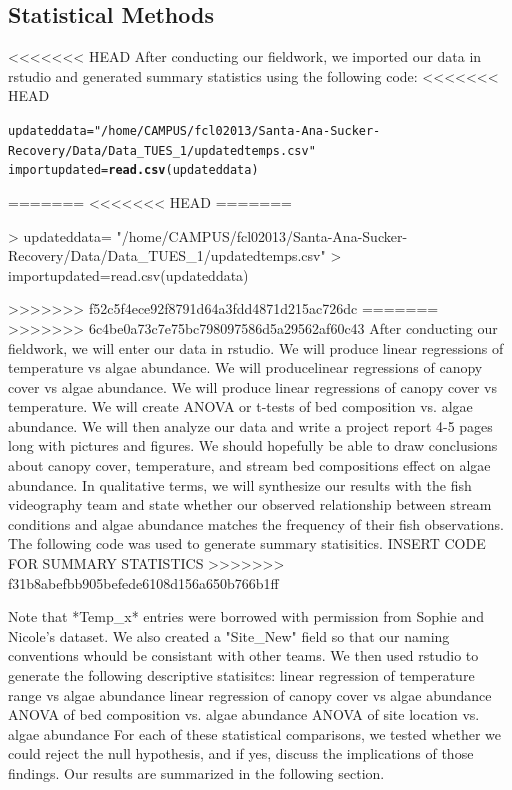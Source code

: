 \documentclass{article}\usepackage[]{graphicx}\usepackage[]{color}
\makeatletter
\newcommand{\hlstr}[1]{\textcolor[rgb]{0.192,0.494,0.8}{#1}}%
\newcommand{\hlstd}[1]{\textcolor[rgb]{0.345,0.345,0.345}{#1}}%
\newcommand{\hlkwb}[1]{\textcolor[rgb]{0.69,0.353,0.396}{#1}}%
\newcommand{\hlkwd}[1]{\textcolor[rgb]{0.737,0.353,0.396}{\textbf{#1}}}%
\newenvironment{kframe}{%
 \def\at@end@of@kframe{}%
 \ifinner\ifhmode%
  \def\at@end@of@kframe{\end{minipage}}%
  \begin{minipage}{\columnwidth}%
 \fi\fi%
 \def\FrameCommand##1{\hskip\@totalleftmargin \hskip-\fboxsep
 \colorbox{shadecolor}{##1}\hskip-\fboxsep
     \hskip-\linewidth \hskip-\@totalleftmargin \hskip\columnwidth}%
 \MakeFramed {\advance\hsize-\width
   \@totalleftmargin\z@ \linewidth\hsize
   \@setminipage}}%
 {\par\unskip\endMakeFramed%
 \at@end@of@kframe}
\newenvironment{knitrout}{}{} %
\makeatother
\begin{document}
\subsection{Statistical Methods}
<<<<<<< HEAD
After conducting our ﬁeldwork, we imported our data in rstudio and generated summary statistics using the following code: 
<<<<<<< HEAD
\begin{knitrout}
\color{fgcolor}\begin{kframe}
\begin{alltt}
\hlstd{updateddata}\hlkwb{=} \hlstr{"/home/CAMPUS/fcl02013/Santa-Ana-Sucker-Recovery/Data/Data_TUES_1/updatedtemps.csv"}
\hlstd{importupdated}\hlkwb{=}\hlkwd{read.csv}\hlstd{(updateddata)}
\end{alltt}
\end{kframe}
\end{knitrout}
=======
<<<<<<< HEAD
=======
\begin{Schunk}
\begin{Sinput}
> updateddata= "/home/CAMPUS/fcl02013/Santa-Ana-Sucker-Recovery/Data/Data_TUES_1/updatedtemps.csv"
> importupdated=read.csv(updateddata)
\end{Sinput}
\end{Schunk}
>>>>>>> f52c5f4ece92f8791d64a3fdd4871d215ac726dc
=======
>>>>>>> 6c4be0a73c7e75bc798097586d5a29562af60c43
After conducting our ﬁeldwork, we will enter our data in rstudio. We will produce linear regressions of temperature vs algae abundance. We will producelinear regressions of canopy cover vs algae abundance. We will produce linear regressions of canopy cover vs temperature. We will create ANOVA or t-tests of bed composition vs. algae abundance. We will then analyze our data and write a project report 4-5 pages long with pictures and ﬁgures. We should hopefully be able to draw conclusions about canopy cover, temperature, and stream bed compositions eﬀect on algae abundance. In qualitative terms, we will synthesize our results with the ﬁsh videography team and state whether our observed relationship between stream conditions and algae abundance matches the frequency of their ﬁsh observations.
The following code was used to generate summary statisitics. 
INSERT CODE FOR SUMMARY STATISTICS
>>>>>>> f31b8abefbb905befede6108d156a650b766b1ff

Note that *Temp_x* entries were borrowed with permission from Sophie and Nicole's dataset. We also created a "Site_New" field so that our naming conventions whould be consistant with other teams. We then used rstudio to generate the following descriptive statisitcs:  
linear regression of temperature range vs algae abundance
linear regression of canopy cover vs algae abundance
ANOVA of bed composition vs. algae abundance
ANOVA of site location vs. algae abundance
For each of these statistical comparisons, we tested whether we could reject the null hypothesis, and if yes, discuss the implications of those findings. Our results are summarized in the following section. 
\end{document}
